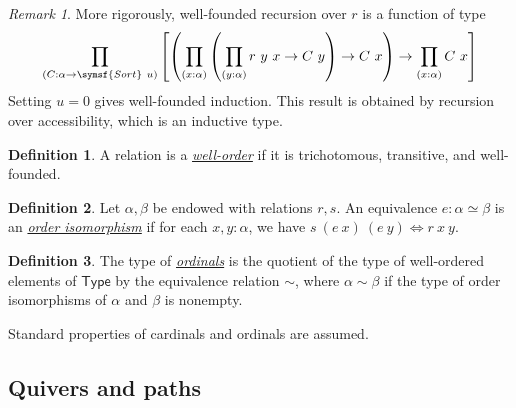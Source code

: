 \documentclass{article}
\newcommand{\mdef}[3]{\href{https://leanprover-community.github.io/mathlib4\_docs/Mathlib/#1.html\##2}{\emph{#3}}}
\theoremstyle{definition}
\newtheorem{definition}{Definition}[section]
\theoremstyle{remark}
\newtheorem*{remark}{Remark}
\begin{document}
\begin{remark}
    More rigorously, well-founded recursion over \( r \) is a function of type
    \[ \prod_{(C : \alpha \to \symsf{Sort}\ u)} \qty[ \qty(\prod_{(x : \alpha)} \qty(\prod_{(y : \alpha)} r\ y\ x \to C\ y) \to C\ x) \to \prod_{(x : \alpha)} C\ x] \]
    Setting \( u = 0 \) gives well-founded induction.
    This result is obtained by recursion over accessibility, which is an inductive type.
\end{remark}
\begin{definition}
    A relation is a \mdef{Order/RelClasses}{IsWellOrder}{well-order} if it is trichotomous, transitive, and well-founded.
\end{definition}
\begin{definition}
    Let \( \alpha, \beta \) be endowed with relations \( r, s \).
    An equivalence \( e : \alpha \simeq \beta \) is an \mdef{Order/Hom/Basic}{OrderIso}{order isomorphism} if for each \( x, y : \alpha \), we have \( s\ (e\ x)\ (e\ y) \Leftrightarrow r\ x\ y \).
\end{definition}
\begin{definition}
    The type of \mdef{SetTheory/Ordinal/Basic}{Ordinal}{ordinals} is the quotient of the type of well-ordered elements of \( \mathsf{Type} \) by the equivalence relation \( \sim \), where \( \alpha \sim \beta \) if the type of order isomorphisms of \( \alpha \) and \( \beta \) is nonempty.
\end{definition}

Standard properties of cardinals and ordinals are assumed.

\subsection{Quivers and paths}
\end{document}
